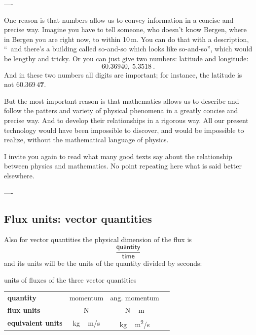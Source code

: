----

One reason is that numbers allow us to convey information in a concise and precise way. Imagine you have to tell someone, who doesn't know
Bergen, where in Bergen you are right now, to within 10\,m. You can do that with a description, \enquote{\textellipsis\ and there's a building called so-and-so which looks like so-and-so\textellipsis}, which would be lengthy and tricky. Or you can just give two numbers: latitude and longitude:
\begin{equation*}
  \num{60.36940},\ \num{5.3518} \ .
\end{equation*}
And in these two numbers all digits are important; for instance, the latitude is not \ensuremath{60.369\,4\bm{7}}.

But the most important reason is that mathematics allows us to describe and follow the patters and variety of physical phenomena in a greatly concise and precise way. And to develop their relationships in a rigorous way.
All our present technology would have been impossible to discover, and would be impossible to realize, without the mathematical language of physics.

I invite you again to read what many good texts say about the relationship between physics and mathematics. No point repeating here what is said better elsewhere.


----

\subsection{Flux units: vector quantities}

Also for vector quantities the physical dimension of the flux is
\begin{equation*}
  \frac{\textsf{quantity}}{\textsf{time}}
\end{equation*}
and its units will be the units of the quantity divided by seconds:
\begin{definition}{units of fluxes of the three vector quantities}
  \centering
  \begin{tabular*}{\linewidth}{@{\extracolsep{\fill}}lccc}
    \textbf{quantity}& momentum & ang. momentum
    \\[2\jot]
    \textbf{flux units}& \unit{N} & \unit{N\,m}
    \\[2\jot]
    \textbf{equivalent units}& \unit{kg\,m/s}  & \unit{kg\,m^2/s}
  \end{tabular*}
  \label{tab:fluxes_vector_units}
\end{definition}



